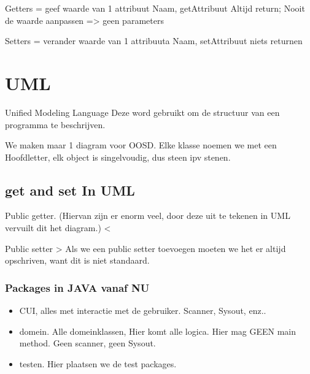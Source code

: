 \documentclass{article}
\begin{document}
Getters = geef waarde van 1 attribuut
Naam, getAttribuut
Altijd return;
Nooit de waarde aanpassen => geen parameters

Setters = verander waarde van 1 attribuuta
Naam, setAttribuut
niets returnen

\section{UML}
Unified Modeling Language
Deze word gebruikt om de structuur van een programma te beschrijven.	

We maken maar 1 diagram voor OOSD. 
Elke klasse noemen we met een Hoofdletter, elk object is singelvoudig, dus steen ipv stenen.

\subsection{get and set In UML}
Public getter. (Hiervan zijn er enorm veel, door deze uit te tekenen in UML vervuilt dit het diagram.) <


Public setter >	Als we een public setter toevoegen moeten we het er altijd opschriven, want dit is niet standaard.


\subsubsection{Packages in JAVA vanaf NU}
\begin{itemize}
\item CUI, alles met interactie met de gebruiker. Scanner, Sysout, enz..
\item domein. Alle domeinklassen, Hier komt alle logica. Hier mag GEEN main method. Geen scanner, geen Sysout.
\item testen. Hier plaatsen we de test packages.
\end{itemize}
\end{document}
